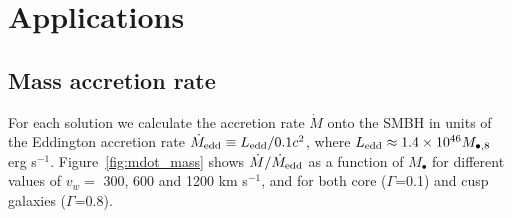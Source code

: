 \documentclass[usenatbib,fleqn]{mn2e}
\newcommand\lsim{\mathrel{\rlap{\lower4pt\hbox{\hskip1pt$\sim$}}
    \raise1pt\hbox{$<$}}}
\newcommand{\Mbh}[1][]{M_{\bullet#1}}
\newcommand{\rIa}{r_{\rm Ia}}
\newcommand{\vwO}{v_{w}}
\newcommand{\tage}{t_{\star}}
\begin{document}



\section{Applications}
\label{sec:applications}

\subsection{Mass accretion rate}
\label{sec:mdot}

For each solution we calculate the accretion rate $\dot{M}$ onto the
SMBH in units of the Eddington accretion rate $\dot{M}_{\rm edd}
\equiv L_{\rm edd}/0.1 c^{2}$, where $L_{\rm edd} \approx 1.4\times
10^{46}M_{\bullet,8}$ erg s$^{-1}$.  Figure~\ref{fig:mdot_mass} shows
$\dot{M}/\dot{M}_{\rm edd}$ as a function of $\Mbh$ for different
values of $\vwO =$ 300, 600 and 1200 km s$^{-1}$, and for both core
($\Gamma$=0.1) and cusp galaxies ($\Gamma$=0.8).
\end{document}
